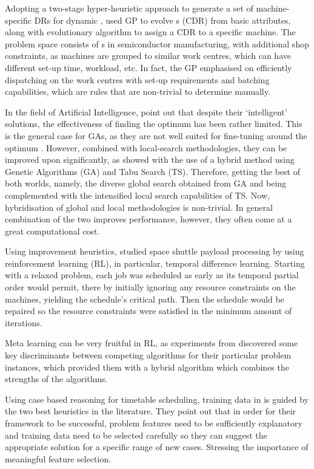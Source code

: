 \documentclass[smallextended]{svjour3}
\begin{document}
Adopting a two-stage hyper-heuristic approach to generate a set of 
machine-specific DRs for dynamic \jsp, \cite{Pickardt2013} used GP to evolve 
\cdr s (CDR) from basic attributes, along with evolutionary algorithm to assign 
a CDR to a specific machine. 
The problem space consists of \jsp s in semiconductor manufacturing, with 
additional shop constraints, as machines are grouped to similar work centres, 
which can have different set-up time, workload, etc. 
In fact, the GP emphasised on efficiently dispatching on the work 
centres with set-up requirements and batching capabilities, which are rules 
that are non-trivial to determine manually.

In the field of Artificial Intelligence, \cite{Meeran12} point out that despite 
their `intelligent' solutions, the effectiveness of finding the optimum has 
been rather limited. This is the general case for GAs, as they are not well 
suited for fine-tuning around the optimum \cite{Cheng99}. 
However, combined with local-search methodologies, they can be improved upon 
significantly, as \cite{Meeran12} showed with the use of a hybrid method using 
Genetic Algorithms (GA) and Tabu Search (TS). 
Therefore, getting the best of both worlds, namely, the diverse global search 
obtained from GA and being complemented with the intensified local search 
capabilities of TS. 
Now, hybridisation of global and local methodologies is non-trivial. In 
general combination of the two improves performance, however, they often come 
at a great computational cost.  

Using improvement heuristics, \cite{Zhang95} studied space shuttle payload 
processing by using reinforcement learning (RL), in particular, temporal 
difference learning. 
Starting with a relaxed problem, each job was scheduled as early as its 
temporal partial order would permit, there by initially ignoring any resource 
constraints on the machines, yielding the schedule's critical path. Then the 
schedule would be repaired so the resource constraints were satisfied in the 
minimum amount of iterations.

Meta learning can be very fruitful in RL, as experiments from 
\cite{Kalyanakrishnan11} discovered some key discriminants between 
competing algorithms for their particular problem instances, which provided 
them with a hybrid algorithm which combines the strengths of the algorithms.

Using case based reasoning for timetable scheduling, training data in 
\cite{Burke06} is guided by the two best heuristics in the literature.
They point out that in order for their framework to be successful, problem 
features need to be sufficiently explanatory and training data need to be 
selected carefully so they can suggest the appropriate solution for a specific 
range of new cases. Stressing the importance of meaningful feature selection. 
\end{document}
